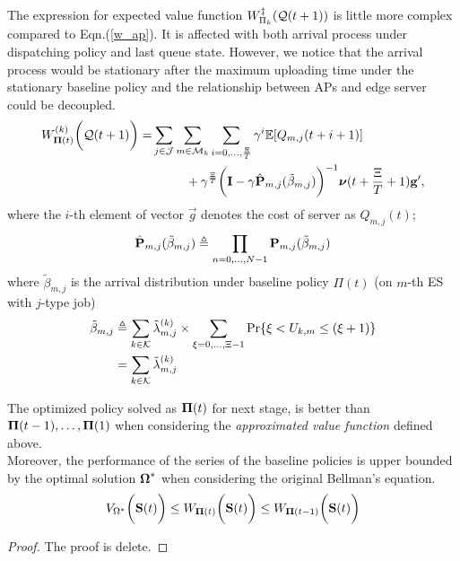 The expression for expected value function $W^{\ddagger}_{\Pi_{k}}(\mathcal{Q}(t+1))$ is little more complex compared to Eqn.(\ref{w_ap}).
It is affected with both arrival process under dispatching policy and last queue state.
However, we notice that the arrival process would be stationary after the maximum uploading time under the stationary baseline policy and the relationship between APs and edge server could be decoupled.
\begin{align}
    W^{(k)}_{\boldsymbol{\Pi}(t)}\bigg(\mathcal{Q}(t+1)\bigg)
    =& \sum_{j\in\mathcal{J}}\sum_{m\in\mathcal{M}_{k}}\sum_{i=0,\dots,\frac{\Xi}{T}} \gamma^{i} \mathbb{E}[ Q_{m,j}({t+i+1}) ]
    \nonumber\\
    &~~~~~~~~+ \gamma^{\frac{\Xi}{T}} \bigg( \mathbf{I} - \gamma \hat{\mathbf{P}}_{m,j}(\tilde{\beta}_{m,j}) \bigg)^{-1} \boldsymbol{\nu}({t+\frac{\Xi}{T}+1}) \mathbf{g}',
\end{align}
where the $i$-th element of vector $\vec{g}$ denotes the cost of server as $Q_{m,j}(t)$;
\begin{align}
    \hat{\mathbf{P}}_{m,j}(\tilde{\beta}_{m,j}) \triangleq \prod_{n=0,\dots,N-1} \mathbf{P}_{m,j}(\tilde{\beta}_{m,j})
\end{align}
where $\tilde{\beta}_{m,j}$ is the arrival distribution under baseline policy $\Pi(t)$ (on $m$-th ES with $j$-type job)
\begin{align}
    \tilde{\beta}_{m,j} &\triangleq \sum_{k\in\mathcal{K}} \tilde{\lambda}^{(k)}_{m,j} \times \sum_{\xi=0,\dots,\Xi-1} \Pr\{ \xi<U_{k,m}\leq(\xi+1) \}
        \nonumber\\
    ~~~~&= \sum_{k\in\mathcal{K}} \tilde{\lambda}^{(k)}_{m,j}
\end{align}

\begin{lemma}
    The optimized policy solved as $\boldsymbol{\Pi}(t)$ for next stage, is better than $\boldsymbol{\Pi}(t-1), \dots, \boldsymbol{\Pi}(1)$ when considering the \emph{approximated value function} defined above.
    \\
    Moreover, the performance of the series of the baseline policies is upper bounded by the optimal solution $\boldsymbol{\Omega}^*$ when considering the original Bellman's equation.
    $$
        V_{\Omega^*}\bigg(\mathbf{S}(t)\bigg)
        \leq W_{\boldsymbol{\Pi}(t)}\bigg(\mathbf{S}(t)\bigg)
        \leq W_{\boldsymbol{\Pi}(t-1)}\bigg(\mathbf{S}(t)\bigg)
    $$
\end{lemma}
\begin{proof}
    The proof is delete.
\end{proof}

